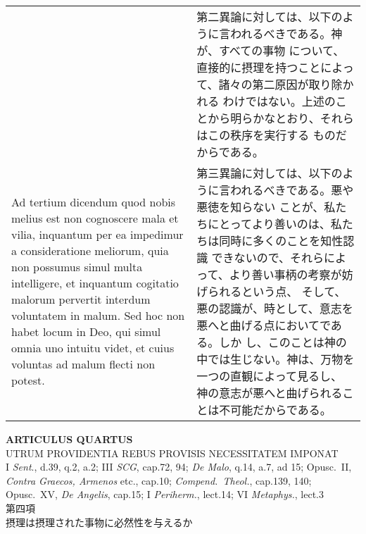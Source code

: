 \documentclass[10pt]{jsarticle} %
\begin{document}
\begin{longtable}{p{21em}p{21em}}
&

第二異論に対しては、以下のように言われるべきである。神が、すべての事物
について、直接的に摂理を持つことによって、諸々の第二原因が取り除かれる
わけではない。上述のことから明らかなとおり、それらはこの秩序を実行する
ものだからである。


\\


Ad tertium dicendum quod nobis melius est non
cognoscere mala et vilia, inquantum per ea impedimur a consideratione
meliorum, quia non possumus simul multa intelligere, et inquantum
cogitatio malorum pervertit interdum voluntatem in malum. Sed hoc non
habet locum in Deo, qui simul omnia uno intuitu videt, et cuius voluntas
ad malum flecti non potest.

&


第三異論に対しては、以下のように言われるべきである。悪や悪徳を知らない
ことが、私たちにとってより善いのは、私たちは同時に多くのことを知性認識
できないので、それらによって、より善い事柄の考察が妨げられるという点、
そして、悪の認識が、時として、意志を悪へと曲げる点においてである。しか
し、このことは神の中では生じない。神は、万物を一つの直観によって見るし、
神の意志が悪へと曲げられることは不可能だからである。



\end{longtable}
\newpage

\begin{center}
 {\Large {\bf ARTICULUS QUARTUS}}\\
 {\large UTRUM PROVIDENTIA REBUS PROVISIS NECESSITATEM IMPONAT}\\
 {\footnotesize I {\itshape Sent}., d.39, q.2, a.2; III {\itshape SCG},
 cap.72, 94; {\itshape De Malo}, q.14, a.7, ad 15; Opusc.~II, {\itshape
 Contra Graecos, Armenos} etc., cap.10; {\itshape Compend.~Theol.},
 cap.139, 140; Opusc.~XV, {\itshape De Angelis}, cap.15; I {\itshape
 Periherm.}, lect.14; VI {\itshape Metaphys.}, lect.3}\\
 {\Large 第四項\\摂理は摂理された事物に必然性を与えるか}
\end{center}
\end{document}
